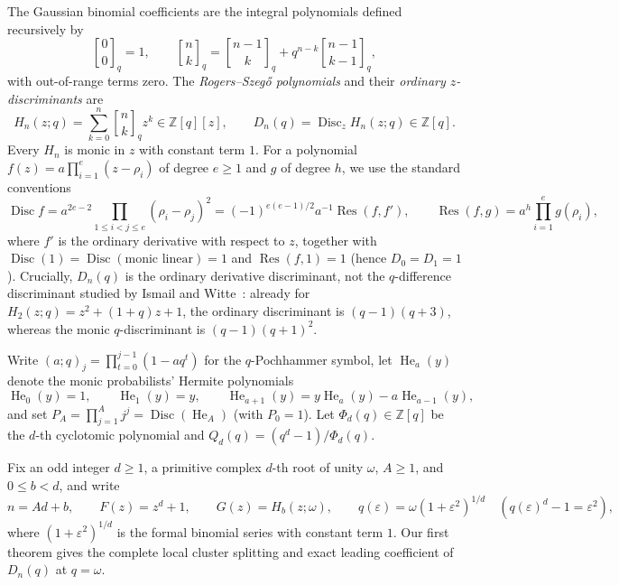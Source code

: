 \documentclass[11pt,reqno]{amsart}
\numberwithin{equation}{section}
\theoremstyle{definition}
\theoremstyle{remark}
\newcommand{\Z}{\mathbb{Z}}
\newcommand{\He}{\operatorname{He}}
\newcommand{\Disc}{\operatorname{Disc}}
\newcommand{\Res}{\operatorname{Res}}
\newcommand{\eps}{\varepsilon}
\newcommand{\qbin}[2]{\genfrac{[}{]}{0pt}{}{#1}{#2}_q}
\begin{document}
The Gaussian binomial coefficients are the integral polynomials defined recursively by
\[
\qbin{0}{0}=1,\qquad \qbin{n}{k}=\qbin{n-1}{k}+q^{n-k}\qbin{n-1}{k-1},
\]
with out-of-range terms zero. The \emph{Rogers--Szeg\H{o} polynomials} and their \emph{ordinary $z$-discriminants} are
\begin{equation}
\label{eq:Hn-Dn}
H_n(z;q)=\sum_{k=0}^n \qbin{n}{k}z^k \in \Z[q][z],\qquad
D_n(q)=\Disc_z H_n(z;q)\in\Z[q].
\end{equation}
Every $H_n$ is monic in $z$ with constant term $1$. For a polynomial $f(z)=a\prod_{i=1}^e(z-\rho_i)$ of degree $e\ge 1$ and $g$ of degree $h$, we use the standard conventions
\begin{equation}
\label{eq:disc-res}
\Disc f = a^{2e-2}\prod_{1\le i<j\le e}(\rho_i-\rho_j)^2 = (-1)^{e(e-1)/2}a^{-1}\Res(f,f'),\qquad
\Res(f,g) = a^h\prod_{i=1}^e g(\rho_i),
\end{equation}
where $f'$ is the ordinary derivative with respect to $z$, together with $\Disc(1)=\Disc(\text{monic linear})=1$ and $\Res(f,1)=1$ (hence $D_0=D_1=1$). Crucially, $D_n(q)$ is the ordinary derivative discriminant, not the $q$-difference discriminant studied by Ismail and Witte~\cite{IW01}: already for $H_2(z;q)=z^2+(1+q)z+1$, the ordinary discriminant is $(q-1)(q+3)$, whereas the monic $q$-discriminant is $(q-1)(q+1)^2$.

Write $(a;q)_j = \prod_{t=0}^{j-1}(1-aq^t)$ for the $q$-Pochhammer symbol, let $\He_a(y)$ denote the monic probabilists' Hermite polynomials
\begin{equation}
\label{eq:He-def}
\He_0(y)=1,\qquad \He_1(y)=y,\qquad \He_{a+1}(y)=y\He_a(y)-a\He_{a-1}(y),
\end{equation}
and set $P_A = \prod_{j=1}^A j^j = \Disc(\He_A)$ (with $P_0=1$). Let $\Phi_d(q)\in\Z[q]$ be the $d$-th cyclotomic polynomial and $Q_d(q)=(q^d-1)/\Phi_d(q)$.

Fix an odd integer $d\ge 1$, a primitive complex $d$-th root of unity $\omega$, $A\ge 1$, and $0\le b<d$, and write
\[
n = Ad+b,\qquad F(z)=z^d+1,\qquad G(z)=H_b(z;\omega),\qquad
q(\eps)=\omega(1+\eps^2)^{1/d}\quad (q(\eps)^d-1=\eps^2),
\]
where $(1+\eps^2)^{1/d}$ is the formal binomial series with constant term $1$. Our first theorem gives the complete local cluster splitting and exact leading coefficient of $D_n(q)$ at $q=\omega$.
\end{document}
